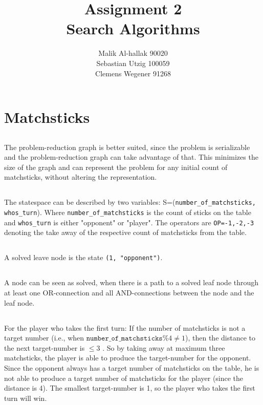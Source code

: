 \documentclass[11pt]{article}
\title{\textbf{Assignment 2\\}Search Algorithms}
\author{Malik Al-hallak 90020\\
		Sebastian Utzig 100059\\
		Clemens Wegener 91268}
\date{}
\begin{document}
\maketitle

\section{Matchsticks}
\subsection{}
The problem-reduction graph is better suited, since the problem is serializable and the problem-reduction graph can take advantage of that. This minimizes the size of the graph and can represent the problem for any initial count of matchsticks, without altering the representation.

\subsection{}
The statespace can be described by two variables: S=(\texttt{number\_of\_matchsticks, whos\_turn}).
Where \texttt{number\_of\_matchsticks} is the count of sticks on the table and \texttt{whos\_turn} is either "opponent" or "player". The operators are \texttt{OP={-1,-2,-3}} denoting the take away of the respective count of matchsticks from the table.

\subsection{}
A solved leave node is the state \texttt{(1, "opponent")}.

\subsection{}
A node can be seen as solved, when there is a path to a solved leaf node through at least one OR-connection and all AND-connections between the node and the leaf node.

\subsection{}
For the player who takes the first turn: If the number of matchsticks is not a target number (i.e., when $\texttt{number\_of\_matchsticks} \% 4 \neq 1$), then the distance to the next target-number is $\leq3$ . So by taking away at maximum three matchsticks, the player is able to produce the target-number for the opponent. Since the opponent always has a target number of matchsticks on the table, he is not able to produce a target number of matchsticks for the player (since the distance is 4).
The smallest target-number is 1, so the player who takes the first turn will win.
\end{document}
